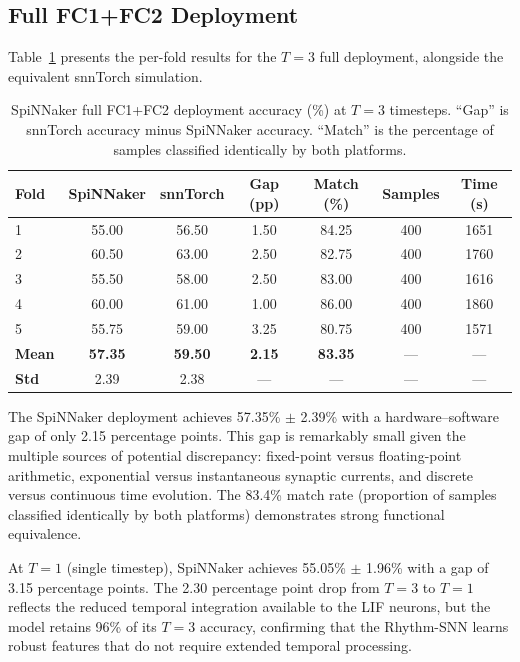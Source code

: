 \subsection{Full FC1+FC2 Deployment}
\label{ssec:full-deploy-results}

Table~\ref{tab:spinnaker-t3} presents the per-fold results for the $T = 3$ full deployment, alongside the equivalent snnTorch simulation.

\begin{table}[t]
\centering
\caption{SpiNNaker full FC1+FC2 deployment accuracy (\%) at $T = 3$ timesteps. ``Gap'' is snnTorch accuracy minus SpiNNaker accuracy. ``Match'' is the percentage of samples classified identically by both platforms.}
\label{tab:spinnaker-t3}
\small
\begin{tabular}{@{}lcccccc@{}}
\toprule
\textbf{Fold} & \textbf{SpiNNaker} & \textbf{snnTorch} & \textbf{Gap (pp)} & \textbf{Match (\%)} & \textbf{Samples} & \textbf{Time (s)} \\
\midrule
1 & 55.00 & 56.50 & 1.50 & 84.25 & 400 & 1651 \\
2 & 60.50 & 63.00 & 2.50 & 82.75 & 400 & 1760 \\
3 & 55.50 & 58.00 & 2.50 & 83.00 & 400 & 1616 \\
4 & 60.00 & 61.00 & 1.00 & 86.00 & 400 & 1860 \\
5 & 55.75 & 59.00 & 3.25 & 80.75 & 400 & 1571 \\
\midrule
\textbf{Mean} & \textbf{57.35} & \textbf{59.50} & \textbf{2.15} & \textbf{83.35} & --- & --- \\
\textbf{Std}  & 2.39 & 2.38 & --- & --- & --- & --- \\
\bottomrule
\end{tabular}
\end{table}

The SpiNNaker deployment achieves 57.35\% $\pm$ 2.39\% with a hardware--software gap of only 2.15 percentage points. This gap is remarkably small given the multiple sources of potential discrepancy: fixed-point versus floating-point arithmetic, exponential versus instantaneous synaptic currents, and discrete versus continuous time evolution. The 83.4\% match rate (proportion of samples classified identically by both platforms) demonstrates strong functional equivalence.

At $T = 1$ (single timestep), SpiNNaker achieves 55.05\% $\pm$ 1.96\% with a gap of 3.15 percentage points. The 2.30 percentage point drop from $T = 3$ to $T = 1$ reflects the reduced temporal integration available to the LIF neurons, but the model retains 96\% of its $T = 3$ accuracy, confirming that the Rhythm-SNN learns robust features that do not require extended temporal processing.

